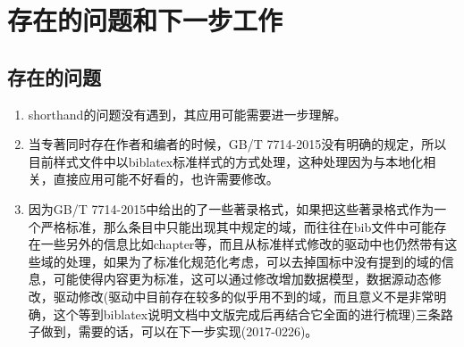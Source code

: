 \section{存在的问题和下一步工作}


\subsection{存在的问题}

\begin{enumerate}





  \item shorthand的问题没有遇到，其应用可能需要进一步理解。

  \item 当专著同时存在作者和编者的时候，GB/T 7714-2015没有明确的规定，所以目前样式文件中以biblatex标准样式的方式处理，这种处理因为与本地化相关，直接应用可能不好看的，也许需要修改。

  \item 因为GB/T 7714-2015中给出的了一些著录格式，如果把这些著录格式作为一个严格标准，那么条目中只能出现其中规定的域，而往往在bib文件中可能存在一些另外的信息比如chapter等，而且从标准样式修改的驱动中也仍然带有这些域的处理，如果为了标准化规范化考虑，可以去掉国标中没有提到的域的信息，可能使得内容更为标准，这可以通过修改增加数据模型，数据源动态修改，驱动修改(驱动中目前存在较多的似乎用不到的域，而且意义不是非常明确，这个等到biblatex说明文档中文版完成后再结合它全面的进行梳理)三条路子做到，需要的话，可以在下一步实现(2017-0226)。
\end{enumerate}

